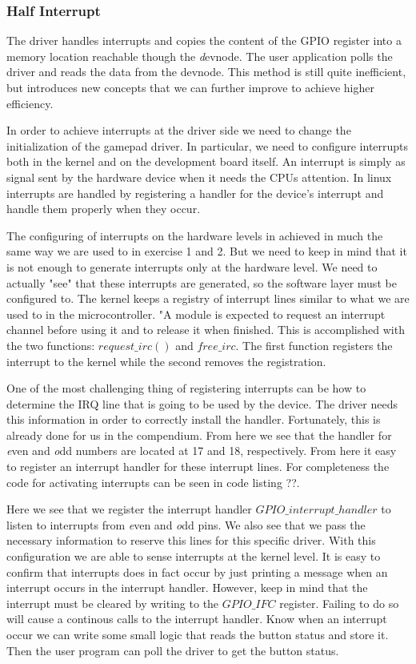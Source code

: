\subsubsection{Half Interrupt}
The driver handles interrupts and copies the content of the GPIO register into a memory location reachable though the {\emph devnode}. The user application polls the driver and reads the data from the devnode. This method is still quite inefficient, but introduces new concepts that we can further improve to achieve higher efficiency. 

In order to achieve interrupts at the driver side we need to change the initialization of the gamepad driver. In particular, we need to configure interrupts both in the kernel and on the development board itself. An interrupt is simply as signal sent by the hardware device when it needs the CPUs attention. In linux interrupts are handled by registering a handler for the device's interrupt and handle them properly when they occur. 

The configuring of interrupts on the hardware levels in achieved in much the same way we are used to 
in exercise 1 and 2. But we need to keep in mind that it is not enough to generate interrupts only at the hardware level. We need to actually "see" that these interrupts are generated, so the software layer must be configured to. The kernel keeps a registry of interrupt lines similar to what we are used to in the microcontroller. "A module is expected to request an interrupt channel before using it and to release it when finished. This is accomplished with the two functions: $request\_irc()$ and $free\_irc$. The first function registers the interrupt to the kernel while the second removes the registration. 

One of the most challenging thing of registering interrupts can be how to determine the IRQ line that is going to be used by the device. The driver needs this information in order to correctly install the handler. Fortunately, this is already done for us in the compendium. From here we see that the handler for {\emph even} and {\emph odd} numbers are located at 17 and 18, respectively. From here it easy to register an interrupt handler for these interrupt lines. For completeness the code for activating interrupts can be seen in code listing ??.


Here we see that we register the interrupt handler $GPIO\_interrupt\_handler$ to listen to interrupts from {\emph even} and {\emph odd} pins. We also see that we pass the necessary information to reserve this lines for this specific driver. With this configuration we are able to sense interrupts at the kernel level. It is easy to confirm that interrupts does in fact occur by just printing a message when an interrupt occurs in the interrupt handler. However, keep in mind that the interrupt must be cleared by writing to the $GPIO\_IFC$ register. Failing to do so will cause a continous calls to the interrupt handler. Know when an interrupt occur we can write some small logic that reads the button status and store it. Then the user program can poll the driver to get the button status. 


